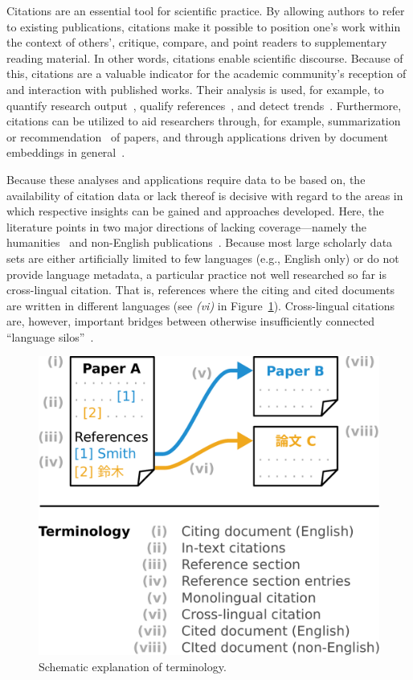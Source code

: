 Citations are an essential tool for scientific practice. By allowing authors to refer to existing publications, citations make it possible to position one's work within the context of others', critique, compare, and point readers to supplementary reading material. In other words, citations enable scientific discourse. Because of this, citations are a valuable indicator for the academic community's reception of and interaction with published works. Their analysis is used, for example, to quantify research output~\cite{Hirsch2005}, qualify references~\cite{Abujbara2013}, and detect trends~\cite{Chen2006}. Furthermore, citations can be utilized to aid researchers through, for example, summarization~\cite{Elkiss2008} or recommendation~\cite{Ma2020,Faerber202x} of papers, and through applications driven by document embeddings in general~\cite{Cohan2020}.

Because these analyses and applications require data to be based on, the availability of citation data or lack thereof is decisive with regard to the areas in which respective insights can be gained and approaches developed. Here, the literature points 
in two major directions of lacking coverage---namely the humanities~\cite{Colavizza2019,Kellsey2004} and non-English publications~\cite{Vera-Baceta2019,Liu2019,Moed2018,Moskaleva2019,MartinMartin2021}.
Because most large scholarly data sets are either artificially limited to few languages (e.g., English only) or do not provide language metadata,
a particular practice not well researched so far is cross-lingual citation. That is, references where the citing and cited documents are written in different languages (see \textit{(vi)} in Figure~\ref{fig:terminology}).
Cross-lingual citations are, however, important bridges between otherwise insufficiently connected ``language silos''~\cite{Shu2019,Moskaleva2019}.

\begin{figure}[tb]
\centering
\includegraphics[width=0.5\linewidth]{figures/ref_xling/terminology_with_text_twocolumn.pdf}
\caption{Schematic explanation of terminology.} \label{fig:terminology}
\end{figure}

